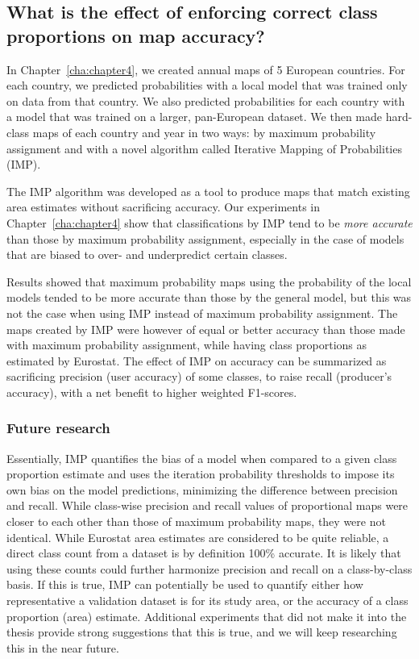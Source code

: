     \subsection{What is the effect of enforcing correct class proportions on map accuracy?}
    \label{syn:rq4}
 
        In Chapter\@~\ref{cha:chapter4}, we created annual maps of 5 European countries. For each country, we predicted probabilities with a local model that was trained only on data from that country. We also predicted probabilities for each country with a model that was trained on a larger, pan-European dataset. We then made hard-class maps of each country and year in two ways: by maximum probability assignment and with a novel algorithm called Iterative Mapping of Probabilities (IMP).
        
        The IMP algorithm was developed as a tool to produce maps that match existing area estimates without sacrificing accuracy. Our experiments in Chapter\@~\ref{cha:chapter4} show that classifications by IMP tend to be \textit{more accurate} than those by maximum probability assignment, especially in the case of models that are biased to over- and underpredict certain classes. 
        
        Results showed that maximum probability maps using the probability of the local models tended to be more accurate than those by the general model, but this was not the case when using IMP instead of maximum probability assignment. The maps created by IMP were however of equal or better accuracy than those made with maximum probability assignment, while having class proportions as estimated by Eurostat. The effect of IMP on accuracy can be summarized as sacrificing precision (user accuracy) of some classes, to raise recall (producer's accuracy), with a net benefit to higher weighted F1-scores.

        \subsubsection{Future research}
        
        Essentially, IMP quantifies the bias of a model when compared to a given class proportion estimate and uses the iteration probability thresholds to impose its own bias on the model predictions, minimizing the difference between precision and recall.
        While class-wise precision and recall values of proportional maps were closer to each other than those of maximum probability maps, they were not identical. While Eurostat area estimates are considered to be quite reliable, a direct class count from a dataset is by definition 100\% accurate. It is likely that using these counts could further harmonize precision and recall on a class-by-class basis. If this is true, IMP can potentially be used to quantify either how representative a validation dataset is for its study area, or the accuracy of a class proportion (area) estimate. Additional experiments that did not make it into the thesis provide strong suggestions that this is true, and we will keep researching this in the near future.
        
